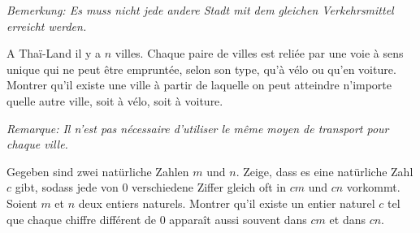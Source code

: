 \documentclass[language=german,style=exam]{smo} %
\begin{document}
\begin{enumerate}
{\textit{Bemerkung: Es muss nicht jede andere Stadt mit dem gleichen Verkehrsmittel erreicht werden.}

\fi
\iffrench %
A Thaï-Land il y a $n$ villes. Chaque paire de villes est reliée par une voie à sens unique qui ne peut être empruntée, selon son type, qu'à vélo ou qu'en voiture. Montrer qu'il existe une ville à partir de laquelle on peut atteindre n'importe quelle autre ville, soit à vélo, soit à voiture.

\textit{Remarque: Il n'est pas nécessaire d'utiliser le même moyen de transport pour chaque ville.} 
\fi
\ifitalian %
\fi

\bigskip
\bigskip

\item[\textbf{12.}] %
\ifgerman %
Gegeben sind zwei natürliche Zahlen $m$ und $n$. Zeige, dass es eine natürliche Zahl $c$ gibt, sodass jede von $0$ verschiedene Ziffer gleich oft in $cm$ und $cn$ vorkommt.
\fi
\iffrench %
Soient $m$ et $n$ deux entiers naturels. Montrer qu'il existe un entier naturel $c$ tel que chaque chiffre différent de $0$ apparaît aussi souvent dans $cm$ et dans $cn$.
\fi
\ifitalian %
\fi
}

\bigskip

\vspace{1cm}


\end{enumerate}
\end{document}
